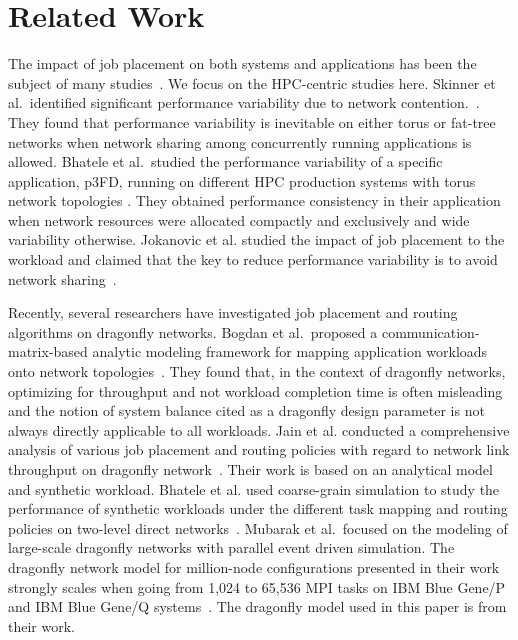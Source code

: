 \section{Related Work}
\label{sec:related work}

The impact of job placement on both systems and applications has been the subject of many studies~\cite{dskinner,abhinav-sc13,jose-ipdps15}. We focus on the HPC-centric studies here. Skinner et al.\ identified significant performance variability due to network contention.~\cite{dskinner}. They found that performance variability is inevitable on either torus or fat-tree networks when network sharing among concurrently running applications is allowed.
Bhatele et al.\ studied the performance variability of a specific application, p3FD, running on different HPC production systems with torus network topologies \cite{abhinav-sc13}. They obtained performance consistency in their application when network resources were allocated compactly and exclusively and wide variability otherwise. Jokanovic et al. studied the impact of job placement to the workload and claimed that the key to reduce performance variability is to avoid network sharing~\cite{jose-ipdps15}. 

Recently, several researchers have investigated job placement and routing algorithms on dragonfly networks. Bogdan et al.\ proposed a communication-matrix-based analytic modeling framework for mapping application workloads onto network topologies~\cite{hoefler-hpdc14}. They found that, in the context of dragonfly networks, optimizing for throughput and not workload completion time is often misleading and the notion of system balance cited as a dragonfly design parameter is not always directly applicable to all workloads.
Jain et al. conducted a comprehensive analysis of various job placement and routing policies with regard to network link throughput on dragonfly network~\cite{jain-sc14}. Their work is based on an analytical model and synthetic workload. Bhatele et al. used coarse-grain simulation to study the performance of synthetic workloads under the different task mapping and routing policies on two-level direct networks~\cite{bhatele-sc11}. Mubarak et al.\ focused on  the modeling of large-scale dragonfly networks with parallel event driven simulation. The dragonfly network model for million-node configurations presented in their work strongly scales when going from 1,024 to 65,536 MPI tasks on IBM Blue Gene/P and IBM Blue Gene/Q systems~\cite{codes-dragonfly}. The dragonfly model used in this paper is from their work. 

